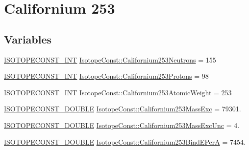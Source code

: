 \hypertarget{group___isotope_const-_californium-_cf253}{}\section{Californium 253}
\label{group___isotope_const-_californium-_cf253}
\subsection*{Variables}
\begin{DoxyCompactItemize}
\item 
\mbox{\hyperlink{group___isotope_const-_macros_ga5f18360b3e99483a35c32d789e62621c}{I\+S\+O\+T\+O\+P\+E\+C\+O\+N\+S\+T\+\_\+\+I\+NT}} \mbox{\hyperlink{group___isotope_const-_californium-_cf253_gabf697afd09bfad8664b608567596ede8}{Isotope\+Const\+::\+Californium253\+Neutrons}} = 155
\item 
\mbox{\hyperlink{group___isotope_const-_macros_ga5f18360b3e99483a35c32d789e62621c}{I\+S\+O\+T\+O\+P\+E\+C\+O\+N\+S\+T\+\_\+\+I\+NT}} \mbox{\hyperlink{group___isotope_const-_californium-_cf253_gaba1384bf2bb9e2b896abdcdd3e05f17f}{Isotope\+Const\+::\+Californium253\+Protons}} = 98
\item 
\mbox{\hyperlink{group___isotope_const-_macros_ga5f18360b3e99483a35c32d789e62621c}{I\+S\+O\+T\+O\+P\+E\+C\+O\+N\+S\+T\+\_\+\+I\+NT}} \mbox{\hyperlink{group___isotope_const-_californium-_cf253_gafdf2c17f274f639e131b887bdec34738}{Isotope\+Const\+::\+Californium253\+Atomic\+Weight}} = 253
\item 
\mbox{\hyperlink{group___isotope_const-_macros_ga8f45a7272ce02c0b4c65c44636ed719a}{I\+S\+O\+T\+O\+P\+E\+C\+O\+N\+S\+T\+\_\+\+D\+O\+U\+B\+LE}} \mbox{\hyperlink{group___isotope_const-_californium-_cf253_ga6fe16df9e400627d1994b78039720c25}{Isotope\+Const\+::\+Californium253\+Mass\+Exc}} = 79301.
\item 
\mbox{\hyperlink{group___isotope_const-_macros_ga8f45a7272ce02c0b4c65c44636ed719a}{I\+S\+O\+T\+O\+P\+E\+C\+O\+N\+S\+T\+\_\+\+D\+O\+U\+B\+LE}} \mbox{\hyperlink{group___isotope_const-_californium-_cf253_gaf0cdddabe5c4ef2aca6a744c25e5d3a8}{Isotope\+Const\+::\+Californium253\+Mass\+Exc\+Unc}} = 4.
\item 
\mbox{\hyperlink{group___isotope_const-_macros_ga8f45a7272ce02c0b4c65c44636ed719a}{I\+S\+O\+T\+O\+P\+E\+C\+O\+N\+S\+T\+\_\+\+D\+O\+U\+B\+LE}} \mbox{\hyperlink{group___isotope_const-_californium-_cf253_ga318265e8d5eedbde68a567ece3f7eb8c}{Isotope\+Const\+::\+Californium253\+Bind\+E\+PerA}} = 7454.

\end{DoxyCompactItemize}
